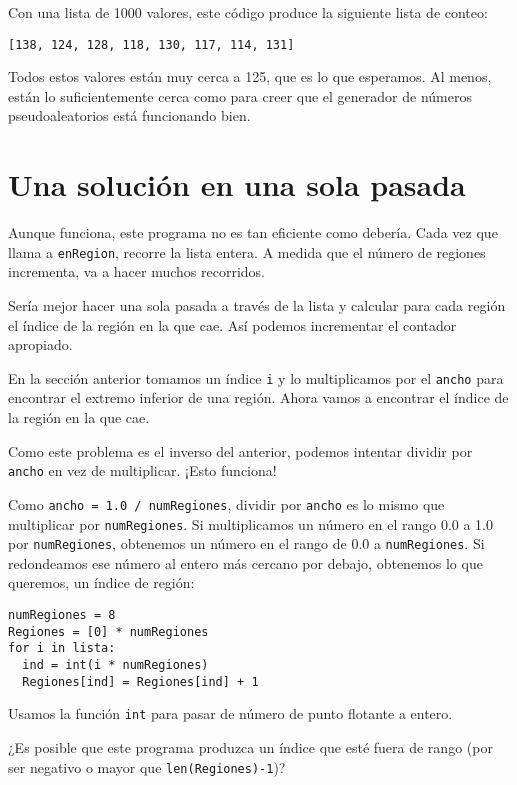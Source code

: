 Con una lista de 1000 valores, este código produce la siguiente lista
de conteo:
\begin{verbatim}
[138, 124, 128, 118, 130, 117, 114, 131]
\end{verbatim}
Todos estos valores están muy cerca a 125, que es lo que esperamos.
Al menos, están lo suficientemente cerca como para creer que el generador
de números pseudoaleatorios está funcionando bien.

\section{Una solución en una sola pasada}

\label{histograma} 

Aunque funciona, este programa no es tan eficiente como debería. Cada
vez que llama a \texttt{enRegion}, recorre la lista entera. A medida
que el número de regiones incrementa, va a hacer muchos recorridos.

Sería mejor hacer una sola pasada a través de la lista y calcular
para cada región el índice de la región en la que cae. Así podemos
incrementar el contador apropiado.

En la sección anterior tomamos un índice \texttt{i} y lo multiplicamos
por el \texttt{ancho} para encontrar el extremo inferior de una región.
Ahora vamos a encontrar el índice de la región en la que cae.

Como este problema es el inverso del anterior, podemos intentar dividir
por \texttt{ancho} en vez de multiplicar. ¡Esto funciona!

Como \texttt{ancho = 1.0 / numRegiones}, dividir por \texttt{ancho}
es lo mismo que multiplicar por \texttt{numRegiones}. Si multiplicamos
un número en el rango 0.0 a 1.0 por \texttt{numRegiones}, obtenemos
un número en el rango de 0.0 a \texttt{numRegiones}. Si redondeamos
ese número al entero más cercano por debajo, obtenemos lo que queremos,
un índice de región:
\begin{verbatim}
numRegiones = 8
Regiones = [0] * numRegiones
for i in lista:
  ind = int(i * numRegiones)
  Regiones[ind] = Regiones[ind] + 1
\end{verbatim}

Usamos la función \texttt{int} para pasar de número de punto flotante
a entero.

¿Es posible que este programa produzca un índice que esté fuera de
rango (por ser negativo o mayor que \texttt{len(Regiones)-1})?

